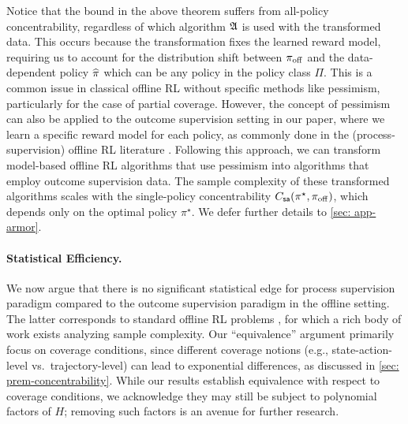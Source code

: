 \documentclass{article}
\newcommand{\icml}[1]{\iftoggle{icml}{#1}{}}
\let\oldparagraph\paragraph
\renewcommand{\paragraph}[1]{\oldparagraph{#1.}}
\begin{document}

Notice that the bound in the above theorem suffers from all-policy concentrability, regardless of which algorithm $\mathfrak{A}$ is used with the transformed data. This occurs because the transformation fixes the learned reward model, requiring us to account for the distribution shift between $\pi_{\mathrm{off}}$ and the data-dependent policy $\widehat{\pi}$ which can be any policy in the policy class $\Pi$.
This is a common issue in classical offline RL without specific methods like pessimism, particularly for the case of partial coverage. However, the concept of pessimism can also be applied to the outcome supervision setting in our paper, where we learn a specific reward model for each policy, as commonly done in the (process-supervision) offline RL literature \citep[e.g.,][]{xie2022armor,cheng2022adversarially,uehara2021pessimistic,bhardwaj2023adversarial}.
Following this approach, we can transform model-based offline RL algorithms that use pessimism \citep{xie2022armor,bhardwaj2023adversarial} into algorithms that employ outcome supervision data. The sample complexity of these transformed algorithms scales with the single-policy concentrability $C_{\mathsf{sa}}(\pi^\star, \pi_{\mathrm{off}})$, which depends only on the optimal policy $\pi^\star$. We defer further details to \cref{sec: app-armor}.


\paragraph{Statistical Efficiency}
We now argue that there is no significant statistical edge for process supervision paradigm compared to the outcome supervision paradigm in the offline setting.
The latter corresponds to standard offline RL problems \citep{levine2020offline,jiang2024offline}, for which a rich body of work exists analyzing sample complexity. Our ``equivalence'' argument primarily focus on coverage conditions, since different coverage notions (e.g., state-action-level vs.~trajectory-level) can lead to exponential differences, as discussed in \cref{sec: prem-concentrability}. While our results establish equivalence with respect to coverage conditions, we acknowledge they may still be subject to polynomial factors of $H$; removing such factors is an avenue for further research.
\end{document}
